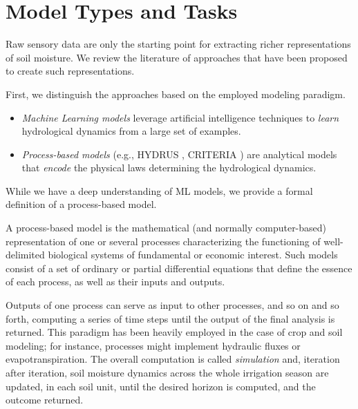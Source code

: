 \section{Model Types and Tasks}
\label{orchard-ssec:models}

Raw sensory data are only the starting point for extracting richer representations of soil moisture.
We review the literature of approaches that
have been proposed to create such representations.

First, we distinguish the approaches based on the employed modeling paradigm.
\begin{itemize}
    \item \emph{Machine Learning models} leverage artificial intelligence techniques to \textit{learn} hydrological dynamics from a large set of examples.
    \item \emph{Process-based models} (e.g., HYDRUS \cite{hydrus2008587}, CRITERIA \cite{Bittelli2011253}) are analytical models that \textit{encode} the physical laws determining the hydrological dynamics.
\end{itemize}
While we have a deep understanding of ML models, we provide a formal definition of a process-based model.

\begin{definition}
    A process-based model is the mathematical (and normally computer-based) representation of one or several processes characterizing the functioning of well-delimited biological systems of fundamental or economic interest.
    Such models consist of a set of ordinary or partial differential equations that define the essence of each process, as well as their inputs and outputs.
\end{definition}


Outputs of one process can serve as input to other processes, and so on and so forth, computing a series of time steps until the output of the final analysis is returned.
This paradigm has been heavily employed in the case of crop and soil modeling; for instance, processes might implement hydraulic fluxes or evapotranspiration.
The overall computation is called \textit{simulation} and, iteration after iteration, soil moisture dynamics across the whole irrigation season are updated, in each soil unit, until the desired horizon is computed, and the outcome returned.

